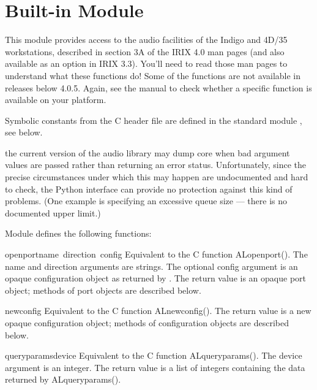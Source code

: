 \section{Built-in Module }

This module provides access to the audio facilities of the Indigo and
4D/35 workstations, described in section 3A of the IRIX 4.0 man pages
(and also available as an option in IRIX 3.3).  You'll need to read
those man pages to understand what these functions do!
Some of the functions are not available in releases below 4.0.5.
Again, see the manual to check whether a specific function is
available on your platform.

Symbolic constants from the C header file  are defined
in the standard module , see below.

 the current version of the audio library may dump core
when bad argument values are passed rather than returning an error
status.  Unfortunately, since the precise circumstances under which
this may happen are undocumented and hard to check, the Python
interface can provide no protection against this kind of problems.
(One example is specifying an excessive queue size --- there is no
documented upper limit.)

Module  defines the following functions:

\renewcommand{\indexsubitem}{(in module al)}
\begin{funcdesc}{openport}{name\, direction\, config}
Equivalent to the C function ALopenport().  The name and direction
arguments are strings.  The optional config argument is an opaque
configuration object as returned by .  The return
value is an opaque port object; methods of port objects are described
below.
\end{funcdesc}

\begin{funcdesc}{newconfig}{}
Equivalent to the C function ALnewconfig().  The return value is a new
opaque configuration object; methods of configuration objects are
described below.
\end{funcdesc}

\begin{funcdesc}{queryparams}{device}
Equivalent to the C function ALqueryparams().  The device argument is
an integer.  The return value is a list of integers containing the
data returned by ALqueryparams().
\end{funcdesc}

